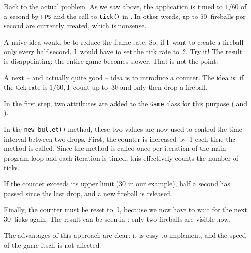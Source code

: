 

Back to the actual problem. As we saw above, the application is timed to $1/60$ of a second by \texttt{FPS} and the call to \texttt{tick()} in . In other words, up to 60~fireballs per second are currently created, which is nonsense.

A naive idea would be to reduce the frame rate. So, if I~want to create a fireball only every half second, I~would have to set the tick rate to~2. Try it! The result is disappointing: the entire game becomes slower. That is not the point.

\begin{hintbox}
	A next -- and actually quite good -- idea is to introduce a counter. The idea is: if the tick rate is $1/60$, I~count up to~30 and only then drop a fireball.
\end{hintbox}

In the first step, two attributes are added to the \texttt{Game} class for this purpose ( and ).



In the \texttt{new\_bullet()} method, these two values are now used to control the time interval between two drops. First, the counter is increased by~1 each time the method is called. Since the method is called once per iteration of the main program loop and each iteration is timed, this effectively counts the number of ticks.
 
If the counter exceeds its upper limit (30 in our example), half a second has passed since the last drop, and a new fireball is released.

Finally, the counter must be reset to~0, because we now have to wait for the next 30~ticks again. The result can be seen in : only two fireballs are visible now.



The advantages of this approach are clear: it is easy to implement, and the speed of the game itself is not affected.

